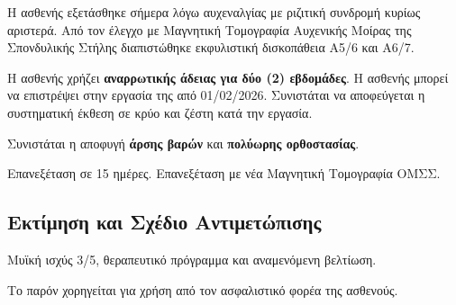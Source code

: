 \documentclass[10pt,greek]{article}
\providecommand\LeaveDays{δύο (2) εβδομάδες}
\begin{document}
\begin{PatientInfo}
\end{PatientInfo}

Η ασθενής εξετάσθηκε σήμερα λόγω αυχεναλγίας με ριζιτική συνδρομή κυρίως αριστερά.
Από τον έλεγχο με Μαγνητική Τομογραφία Αυχενικής Μοίρας της Σπονδυλικής Στήλης διαπιστώθηκε εκφυλιστική δισκοπάθεια Α5/6 και Α6/7.

Η ασθενής χρήζει \textbf{αναρρωτικής άδειας για \LeaveDays}.
Η ασθενής μπορεί να επιστρέψει στην εργασία της από 01/02/2026.
Συνιστάται να αποφεύγεται η συστηματική έκθεση σε κρύο και ζέστη κατά την εργασία.

Συνιστάται η αποφυγή \textbf{άρσης βαρών} και \textbf{πολύωρης ορθοστασίας}.

Επανεξέταση σε 15 ημέρες.
Επανεξέταση με νέα Μαγνητική Τομογραφία ΟΜΣΣ.

\subsection*{Εκτίμηση και Σχέδιο Αντιμετώπισης}
Μυϊκή ισχύς 3/5, θεραπευτικό πρόγραμμα και αναμενόμενη βελτίωση.

Το παρόν χορηγείται για χρήση από τον ασφαλιστικό φορέα της ασθενούς.
\end{document}
